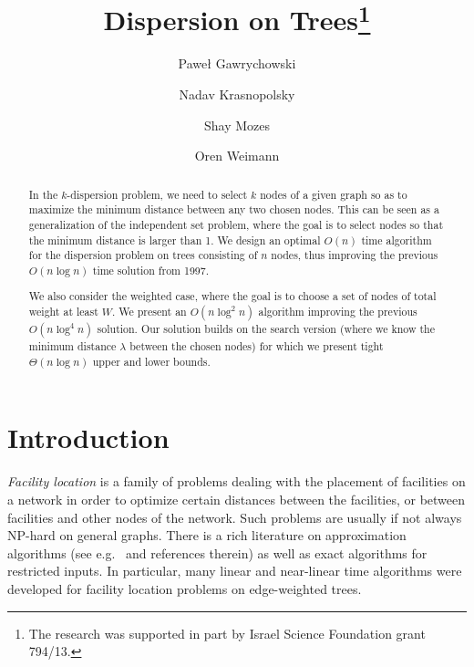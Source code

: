 \documentclass[11pt,a4paper]{article}
\newcommand{\Oh}{{O}}
\theoremstyle{definition}
\theoremstyle{remark}
\begin{document}
\title{Dispersion on Trees\thanks{The research was supported in part by Israel Science Foundation grant 794/13.}}
\author[1]{Pawe\l{} Gawrychowski}
\author[1]{Nadav Krasnopolsky}
\author[2]{Shay Mozes}
\author[1]{Oren Weimann}


\date{}
\maketitle

\begin{abstract}
In the $k$-dispersion problem, we need to select $k$ nodes of a given graph so as to maximize
the minimum distance between any two chosen nodes. This can be seen as a generalization
of the independent set problem, where the goal is to select nodes so that the minimum distance
is larger than 1.
We design an optimal $\Oh(n)$ time algorithm for the dispersion problem on trees consisting
of $n$ nodes, thus improving the previous  $\Oh(n\log n)$ time solution from 1997. 

We also consider the weighted case, where the goal is to choose a set of nodes of total weight at least $W$. We present an $\Oh(n\log^2n)$ algorithm improving the previous $\Oh(n\log^4 n)$ solution. Our solution builds on the search version (where we know the minimum distance $\lambda$ between the chosen nodes) for which we present tight $\Theta(n\log n)$ upper and lower bounds. 
\end{abstract}

\section{Introduction}

\emph{Facility location} is a family of problems dealing with the placement of facilities on a network in order to optimize certain distances between the facilities, or between facilities and other nodes of the network. Such problems are usually if not always NP-hard on general graphs. There is a rich literature on approximation algorithms (see e.g.~\cite{DavidB.Shmoys1997,Vazirani2003} and references therein) as well as exact algorithms for restricted inputs. In particular, many linear and near-linear time algorithms were developed for facility location problems on edge-weighted trees.   
\end{document}
